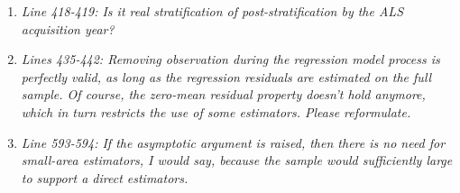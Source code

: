 \documentclass{article}
\begin{document}
\begin{enumerate}
  

  
  
  \item \textit{Line 418-419: Is it real stratification of post-stratification by the ALS acquisition year?}
  
  
  
  \item \textit{Lines 435-442: Removing observation during the regression model process is perfectly valid, as long as the regression residuals are estimated on the full sample. Of course, the zero-mean residual property doesn’t hold anymore, which in turn restricts the use of some estimators. Please reformulate.}
  


  
  \item \textit{Line 593-594: If the asymptotic argument is raised, then there is no need for small-area estimators, I would say, because the sample would sufficiently large to support a direct estimators.}
  

\end{enumerate}
\end{document}
